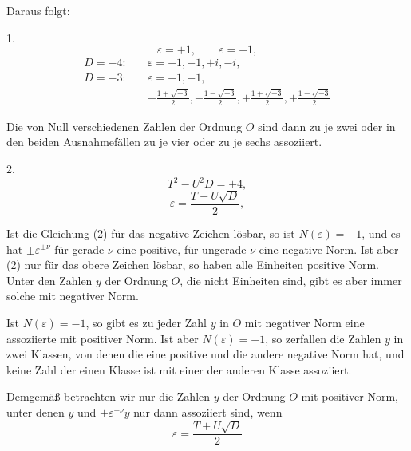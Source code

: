 Daraus folgt:

1. 
\[ \varepsilon = +1, \qquad \varepsilon = -1, \]
\[
\begin{aligned}
D=-4\colon\quad &\varepsilon=+1,-1,+i,-i,\\
D=-3\colon\quad &\varepsilon=+1,-1,\\
&-\frac{1+\sqrt{-3}}{2},-\frac{1-\sqrt{-3}}{2},+\frac{1+\sqrt{-3}}{2},+\frac{1-\sqrt{-3}}{2}
\end{aligned}
\]

Die von Null verschiedenen Zahlen der Ordnung $O$ sind dann zu je zwei oder in den beiden Ausnahmefällen zu je vier oder zu je sechs assoziiert.

2. 
\[ T^2 - U^2 D = \pm 4, \]
\[ \varepsilon = \frac{T + U\sqrt{D}}{2}, \]

Ist die Gleichung (2) für das negative Zeichen lösbar, so ist $N(\varepsilon) = -1$, und es hat $\pm \varepsilon^{\pm\nu}$ für gerade $\nu$ eine positive, für ungerade $\nu$ eine negative Norm. Ist aber (2) nur für das obere Zeichen lösbar, so haben alle Einheiten positive Norm. Unter den Zahlen $y$ der Ordnung $O$, die nicht Einheiten sind, gibt es aber immer solche mit negativer Norm.

Ist $N(\varepsilon) = -1$, so gibt es zu jeder Zahl $y$ in $O$ mit negativer Norm eine assoziierte mit positiver Norm. Ist aber $N(\varepsilon) = +1$, so zerfallen die Zahlen $y$ in zwei Klassen, von denen die eine positive und die andere negative Norm hat, und keine Zahl der einen Klasse ist mit einer der anderen Klasse assoziiert.

Demgemäß betrachten wir nur die Zahlen $y$ der Ordnung $O$ mit positiver Norm, unter denen $y$ und $\pm \varepsilon^{\pm\nu} y$ nur dann assoziiert sind, wenn
\[ \varepsilon = \frac{T + U\sqrt{D}}{2} \]
